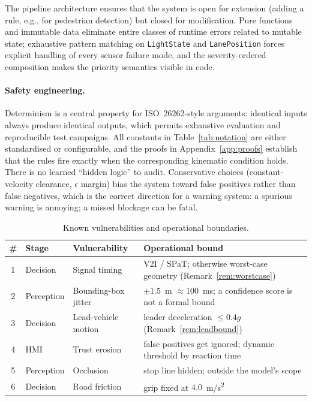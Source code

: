 \documentclass[conference, a4paper]{IEEEtran}
\theoremstyle{plain}
\begin{document}
The pipeline architecture ensures that the system is open for extension
(adding a rule, e.g., for pedestrian detection) but closed for modification.
Pure functions and immutable data eliminate entire classes of runtime errors
related to mutable state; exhaustive pattern matching on \texttt{LightState}
and \texttt{LanePosition} forces explicit handling of every sensor failure
mode, and the severity-ordered composition makes the priority semantics
visible in code.

\paragraph{Safety engineering.} Determinism is a central property for
ISO~26262-style arguments: identical inputs always produce identical
outputs, which permits exhaustive evaluation and reproducible test
campaigns. All constants in Table~\ref{tab:notation} are either
standardised or configurable, and the proofs in
Appendix~\ref{app:proofs} establish that the rules fire exactly when the
corresponding kinematic condition holds. There is no learned ``hidden
logic'' to audit. Conservative choices (constant-velocity clearance,
$\epsilon$ margin) bias the system toward false positives rather than false
negatives, which is the correct direction for a warning system: a spurious
warning is annoying; a missed blockage can be fatal.

\begin{table}[t]
\caption{Known vulnerabilities and operational boundaries.}
\label{tab:vuln}
\centering
\footnotesize
\begin{tabular}{@{}clll@{}}
\toprule
\# & Stage & Vulnerability & Operational bound \\
\midrule
1 & Decision & Signal timing & V2I / SPaT; otherwise worst-case geometry (Remark~\ref{rem:worstcase}) \\
2 & Perception & Bounding-box jitter & $\pm 1.5$~m $\approx 100$~ms; a confidence score is not a formal bound \\
3 & Decision & Lead-vehicle motion & leader deceleration $\leq 0.4g$ (Remark~\ref{rem:leadbound}) \\
4 & HMI & Trust erosion & false positives get ignored; dynamic threshold by reaction time \\
5 & Perception & Occlusion & stop line hidden; outside the model's scope \\
6 & Decision & Road friction & grip fixed at $4.0$~\si{m/s^2} \\
\bottomrule
\end{tabular}
\end{table}
\end{document}
